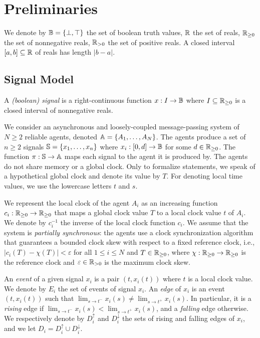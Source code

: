 \section{Preliminaries}

We denote by $\B = \{ \bot, \top \}$ the set of boolean truth values, $\R$ the set of reals, $\R_{\geq 0}$ the set of nonnegative reals, $\R_{> 0}$ the set of positive reals.
A closed interval $[a,b] \subseteq \R$ of reals has length $|b-a|$.

\subsection{Signal Model}

\begin{definition}
	A \emph{(boolean) signal} is a right-continuous function $x : I \to \B$ where $I \subseteq \R_{\geq 0}$ is a closed interval of nonnegative reals.
\end{definition}

We consider an asynchronous and loosely-coupled message-passing system of $N \geq 2$ reliable agents, denoted $\A = \{A_1, \ldots, A_N\}$.
The agents produce a set of $n \geq 2$ signals $\S = \{x_1, \ldots, x_n\}$ where $x_i : [0,d] \to \B$ for some $d \in \R_{\geq 0}$.
The function $\pi : \S \to \A$ maps each signal to the agent it is produced by.
The agents do not share memory or a global clock.
Only to formalize statements, we speak of a hypothetical global clock and denote its value by $T$.
For denoting local time values, we use the lowercase letters $t$ and $s$.

We represent the local clock of the agent $A_i$ as an increasing function $c_i : \R_{\geq 0} \to \R_{\geq 0}$ that maps a global clock value $T$ to a local clock value $t$ of $A_i$.
We denote by $c_i^{-1}$ the inverse of the local clock function $c_i$.
We assume that the system is \emph{partially synchronous}: the agents use a clock synchronization algorithm that guarantees a bounded clock skew with respect to a fixed reference clock, i.e., $|c_i(T) - \chi(T)| < \varepsilon$ for all $1 \leq i \leq N$ and $T \in \R_{\geq 0}$, where $\chi : \R_{\geq 0} \to \R_{\geq 0}$ is the reference clock and $\varepsilon \in \R_{> 0}$ is the maximum clock skew. %

An \emph{event} of a given signal $x_i$ is a pair $(t, x_i(t))$ where $t$ is a local clock value.
We denote by $E_i$ the set of events of signal $x_i$.
An \emph{edge} of $x_i$ is an event $(t, x_i(t))$ such that $\lim_{s \to t^-} x_i(s) \neq \lim_{s \to t^+} x_i(s)$.
In particular, it is a \emph{rising} edge if $\lim_{s \to t^-} x_i(s) < \lim_{s \to t^+} x_i(s)$, and a \emph{falling} edge otherwise.
We respectively denote by $D_i^\uparrow$ and $D_i^\downarrow$ the sets of rising and falling edges of $x_i$, and we let $D_i = D_i^\uparrow \cup D_i^\downarrow$. %

